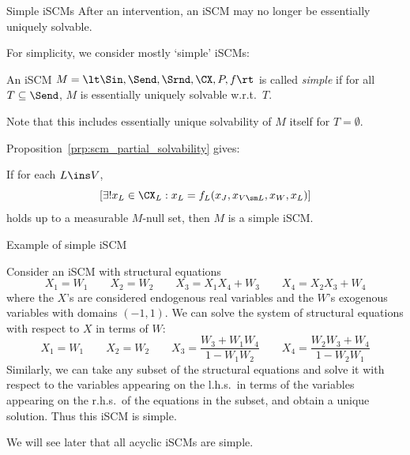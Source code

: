 \begin{frame}{Simple iSCMs}
After an intervention, an iSCM may no longer be essentially uniquely solvable.

For simplicity, we consider mostly `simple' iSCMs:
\begin{Def}[\ref{def:simple_scm}]
  An iSCM $M = \lt \Sin, \Send, \Srnd, \CX, P, f \rt$ is called \emph{simple} if for all $T \subseteq \Send$, $M$ is essentially uniquely solvable w.r.t.\ $T$.
\end{Def}
Note that this includes essentially unique solvability of $M$ itself for $T = \emptyset$.

Proposition~\ref{prp:scm_partial_solvability} gives:
\begin{Rem}
If for each $L \ins V$, 
$$[\exists! x_L \in \CX_L : x_L = f_L(x_J,x_{V\sm L},x_W,x_L)]$$
holds up to a measurable $M$-null set, then $M$ is a simple iSCM.
\end{Rem}
\end{frame}

\begin{frame}{Example of simple iSCM}
\begin{Eg}[\ref{eg:simple_scm}]
Consider an iSCM with structural equations
$$X_1 = W_1 \qquad X_2 = W_2 \qquad X_3 = X_1 X_4 + W_3 \qquad X_4 = X_2 X_3 + W_4 $$
where the $X$'s are considered endogenous real variables and the $W$'s exogenous variables with domains $(-1,1)$.
We can solve the system of structural equations with respect to $X$ in terms of $W$:
$$X_1 = W_1 \qquad X_2 = W_2 \qquad X_3 = \frac{W_3 + W_1 W_4}{1 - W_1 W_2} \qquad X_4 = \frac{W_2 W_3 + W_4}{1 - W_2 W_1}$$
Similarly, we can take any subset of the structural equations and solve it with respect to the variables appearing on the l.h.s.\ in terms of the variables appearing on the r.h.s.\ of the equations in the subset, and obtain a unique solution. Thus this iSCM is simple.
\end{Eg}
We will see later that all acyclic iSCMs are simple.
\end{frame}

